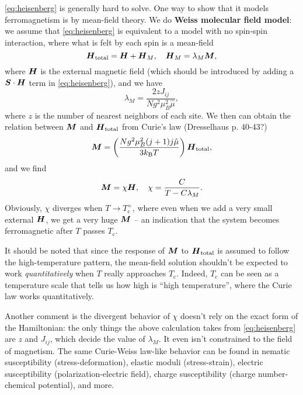 \documentclass[hyperref, a4paper]{article}
\newcommand*{\concept}[1]{{\textbf{#1}}}
\newcommand*{\Tc}{T_{\text{c}}}
\begin{document}
\eqref{eq:heisenberg} is generally hard to solve.
One way to show that it models ferromagnetism is by mean-field theory.
We do \concept{Weiss molecular field model}:
we assume that \eqref{eq:heisenberg} is equivalent to a model with no spin-spin interaction,
where what is felt by each spin is a mean-field 
\begin{equation}
    \vb*{H}_{\text{total}} = \vb*{H} + \vb*{H}_M, \quad 
    \vb*{H}_M = \lambda_M \vb*{M},
\end{equation}
where $\vb*{H}$ is the external magnetic field 
(which should be introduced by adding a $\vb*{S} \cdot \vb*{H}$ term in \eqref{eq:heisenberg}),
and we have 
\begin{equation}
    \lambda_M = \frac{2 z J_{ij}}{N g^2 \mu_B^2 \hat{\mu}},
\end{equation}
where $z$ is the number of nearest neighbors of each site.
We then can obtain the relation between $\vb*{M}$ and $\vb*{H}_{\text{total}}$
from Curie's law (Dresselhaus p. 40-43?)
\begin{equation}
    \vb*{M} = \left(
        \frac{N g^2 \mu_B^2 (j+1) j \hat{\mu}}{3 k_{\text{B}} T} 
    \right) \vb*{H}_{\text{total}},
\end{equation}
and we find 
\begin{equation}
    \vb*{M} = \chi \vb*{H}, \quad 
    \chi = \frac{C}{T - C \lambda_M}.
\end{equation}
Obviously, $\chi$ diverges when $T \to T_{\text{c}}^+$,
where even when we add a very small external $\vb*{H}$,
we get a very huge $\vb*{M}$ -- 
an indication that the system becomes ferromagnetic after $T$ passes $T_{\text{c}}$.

It should be noted that since the response of $\vb*{M}$ to $\vb*{H}_{\text{total}}$
is assumed to follow the high-temperature pattern,
the mean-field solution shouldn't be expected to work \emph{quantitatively}
when $T$ really approaches $\Tc$.
Indeed, $\Tc$ can be seen as a temperature scale 
that tells us how high is ``high temperature'',
where the Curie law works quantitatively.

Another comment is the divergent behavior of $\chi$ doesn't rely on the 
exact form of the Hamiltonian:
the only things the above calculation takes from \eqref{eq:heisenberg} 
are $z$ and $J_{ij}$, which decide the value of $\lambda_M$.
It even isn't constrained to the field of magnetism.
The same Curie-Weiss law-like behavior can be found 
in nematic susceptibility (stress-deformation),
elastic moduli (stress-strain),
electric susceptibility (polarization-electric field),
charge susceptibility (charge number-chemical potential),
and more.
\end{document}
